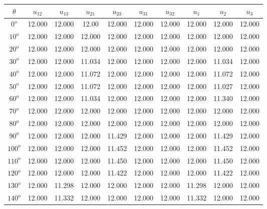 	\singlespacing
	\begin{table}[H]
	    \centering
	    \begin{tabular}{|c|c|c|c|c|c|c|c|c|c|}
        \hline
	$\theta$ & $u_{12}$ & $u_{13}$ & $u_{21}$ & $u_{23}$ & $u_{31}$ & $u_{32}$ & $u_{1}$ & $u_{2}$ & $u_{3}$  \\
	         \hline
	         $0^{o}$ & 12.000 & 12.000 & 12.00 & 12.000 & 12.000 & 12.000 & 12.000& 12.000 & 12.000  \\
	         \hline
	         $10^{o}$ & 12.000 & 12.000 & 12.000 & 12.000 & 12.000 & 12.000 & 12.000& 12.000 & 12.000  \\
	         \hline
	         $20^{o}$ & 12.000 & 12.000 & 12.000 & 12.000 & 12.000 & 12.000 & 12.000& 12.000 & 12.000  \\
	         \hline
	         $30^{o}$ & 12.000 & 12.000 & 11.034 & 12.000 & 12.000 & 12.000 & 12.000& 11.034 & 12.000  \\
	         \hline
	         $40^{o}$ & 12.000 & 12.000 & 11.072 & 12.000 & 12.000 & 12.000 & 12.000& 11.072 & 12.000  \\
	         \hline
	         $50^{o}$ & 12.000 & 12.000 & 11.072 & 12.000 & 12.000 & 12.000 & 12.000& 11.027 & 12.000 \\
	         \hline
	         $60^{o}$ & 12.000 & 12.000 & 11.034 & 12.000 & 12.000 & 12.000 & 12.000& 11.340 & 12.000  \\
	         \hline
	         $70^{o}$ & 12.000 & 12.000 & 12.000 & 12.000 & 12.000 & 12.000 & 12.000& 12.000 & 12.000  \\
	         \hline
	         $80^{o}$ & 12.000 & 12.000 & 12.000 & 12.000 & 12.000 & 12.000 & 12.000& 12.000 & 12.000  \\
	         \hline
	         $90^{o}$ & 12.000 & 12.000 & 12.000 & 11.429 & 12.000 & 12.000 & 12.000& 11.429 & 12.000 \\
	         \hline
	         $100^{o}$ & 12.000 & 12.000 & 12.000 & 11.452 & 12.000 & 12.000 & 12.000& 11.452 & 12.000  \\
	         \hline
	         $110^{o}$ & 12.000 & 12.000 & 12.000 & 11.450 & 12.000 & 12.000 & 12.000& 11.450 & 12.000  \\
	         \hline
	         $120^{o}$ & 12.000 & 12.000 & 12.000 & 11.422 & 12.000 & 12.000 & 12.000& 11.422 & 12.000  \\
	         \hline
	         $130^{o}$ & 12.000 & 11.298 & 12.000 & 12.000 & 12.000 & 12.000 & 11.298 & 12.000 & 12.000  \\
	         \hline
	         $140^{o}$ & 12.000 & 11.332 & 12.000 & 12.000 & 12.000 & 12.000 & 11.332 & 12.000 & 12.000  \\

\end{tabular}
\end{table}
